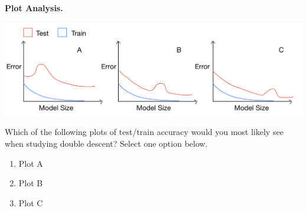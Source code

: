 \item {}
\textbf{Plot Analysis.}
\begin{center}
    \includegraphics[scale=0.25]{double-descent/IMG_0633.jpg}
\end{center}
Which of the following plots of test/train accuracy would you most likely see when studying double descent? Select one option below.

\begin{enumerate}[label=(\alph*)]
    \item Plot A
    \item Plot B
    \item Plot C
\end{enumerate} 
